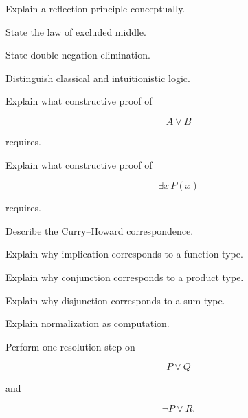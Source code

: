 \begin{exercise}[3]
Explain a reflection principle conceptually.
\end{exercise}

\begin{exercise}[2]
State the law of excluded middle.
\end{exercise}

\begin{exercise}[2]
State double-negation elimination.
\end{exercise}

\begin{exercise}[3]
Distinguish classical and intuitionistic logic.
\end{exercise}

\begin{exercise}[3]
Explain what constructive proof of

\[
A\lor B
\]

requires.
\end{exercise}

\begin{exercise}[3]
Explain what constructive proof of

\[
\exists x\,P(x)
\]

requires.
\end{exercise}

\begin{exercise}[3]
Describe the Curry--Howard correspondence.
\end{exercise}

\begin{exercise}[3]
Explain why implication corresponds to a function type.
\end{exercise}

\begin{exercise}[3]
Explain why conjunction corresponds to a product type.
\end{exercise}

\begin{exercise}[3]
Explain why disjunction corresponds to a sum type.
\end{exercise}

\begin{exercise}[3]
Explain normalization as computation.
\end{exercise}

\begin{exercise}[2]
Perform one resolution step on

\[
P\lor Q
\]

and

\[
\neg P\lor R.
\]
\end{exercise}

